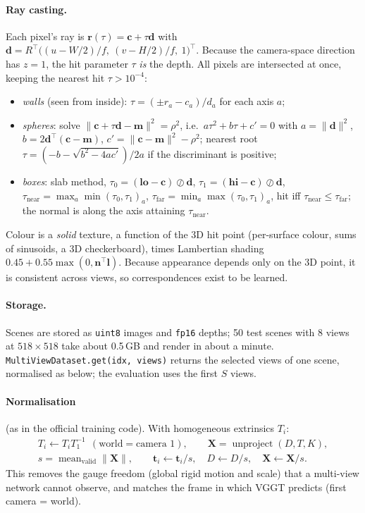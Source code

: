 \documentclass[11pt,a4paper]{article}
\begin{document}
\paragraph{Ray casting.} Each pixel's ray is $\mathbf{r}(\tau) = \mathbf{c} + \tau\mathbf{d}$ with
$\mathbf{d} = R^\top\big((u - W/2)/f,\ (v-H/2)/f,\ 1\big)^\top$. Because the camera-space direction has $z = 1$, the hit
parameter $\tau$ \emph{is} the depth. All pixels are intersected at once, keeping the nearest hit $\tau>10^{-4}$:
\begin{itemize}[nosep]
  \item \emph{walls} (seen from inside): $\tau = (\pm r_a - c_a)/d_a$ for each axis $a$;
  \item \emph{spheres}: solve $\|\mathbf{c} + \tau\mathbf{d} - \mathbf{m}\|^2 = \rho^2$, i.e.\ $a\tau^2 + b\tau + c' = 0$ with
        $a = \|\mathbf{d}\|^2$, $b = 2\mathbf{d}^\top(\mathbf{c}-\mathbf{m})$, $c' = \|\mathbf{c}-\mathbf{m}\|^2 - \rho^2$;
        nearest root $\tau = (-b - \sqrt{b^2 - 4ac'})/2a$ if the discriminant is positive;
  \item \emph{boxes}: slab method, $\tau_0 = (\mathbf{lo}-\mathbf{c})\oslash\mathbf{d}$, $\tau_1 = (\mathbf{hi}-\mathbf{c})\oslash\mathbf{d}$,
        $\tau_{\text{near}} = \max_a\min(\tau_0,\tau_1)_a$, $\tau_{\text{far}} = \min_a\max(\tau_0,\tau_1)_a$, hit iff
        $\tau_{\text{near}}\le\tau_{\text{far}}$; the normal is along the axis attaining $\tau_{\text{near}}$.
\end{itemize}
Colour is a \emph{solid} texture, a function of the 3D hit point (per-surface colour, sums of sinusoids, a 3D checkerboard),
times Lambertian shading $0.45 + 0.55\max(0, \mathbf{n}^\top\mathbf{l})$. Because appearance depends only on the 3D point,
it is consistent across views, so correspondences exist to be learned.

\paragraph{Storage.} Scenes are stored as \texttt{uint8} images and \texttt{fp16} depths; 50 test scenes with 8 views at
$518\times518$ take about 0.5\,GB and render in about a minute. \texttt{MultiViewDataset.get(idx, views)} returns the
selected views of one scene, normalised as below; the evaluation uses the first $S$ views.

\paragraph{Normalisation} (as in the official training code). With homogeneous extrinsics $T_i$:
\begin{gather*}
  T_i \leftarrow T_i T_1^{-1}\ \ (\text{world} = \text{camera }1),\qquad
  \mathbf{X} = \operatorname{unproject}(D, T, K),\\
  s = \operatorname{mean}_{\text{valid}}\|\mathbf{X}\|,\qquad
  \mathbf{t}_i \leftarrow \mathbf{t}_i/s,\quad D\leftarrow D/s,\quad \mathbf{X}\leftarrow\mathbf{X}/s .
\end{gather*}
This removes the gauge freedom (global rigid motion and scale) that a multi-view network cannot observe, and matches
the frame in which VGGT predicts (first camera = world).
\end{document}
